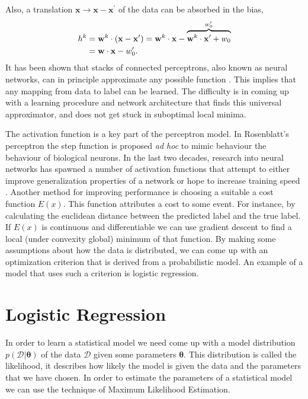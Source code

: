 \noindent Also, a translation $\mathbf{x}\rightarrow \mathbf{x} - \mathbf{x}^\prime$ of the data can be absorbed in the bias,
\begin{align}
    h^k &= \mathbf{w}^{k}\cdot (\mathbf{x} - \mathbf{x}^\prime)= \mathbf{w}^{k} \cdot \mathbf{x} - \overbrace{\mathbf{w}^{k}\cdot\mathbf{x}^\prime + w_0}^{w_0^\prime} \nonumber\\
    & = \mathbf{w}\cdot\mathbf{x} - w_0^\prime \label{eq:transl_inv}.
\end{align}
It has been shown that stacks of connected perceptrons, also known as neural networks, can in principle approximate any possible function \cite{Cybenko1989}. This implies that any mapping from data to label can be learned. The difficulty is in coming up with a learning procedure and network architecture that finds this universal approximator, and does not get stuck in suboptimal local minima. \newline

\noindent The activation function is a key part of the perceptron model. In Rosenblatt's perceptron the step function is proposed \textit{ad hoc} to mimic behaviour the behaviour of biological neurons. In the last two decades, research into neural networks has spawned a number of activation functions that attempt to either improve generalization properties of a network or hope to increase training speed \cite{Glorot15, Clevert2015, Hochreiter1998}. Another method for improving performance is choosing a suitable a cost function $E(x)$. This function attributes a cost to some event. For instance, by calculating the euclidean distance between the predicted label and the true label. If $E(x)$  is continuous and differentiable we can use gradient descent to find a local (under convexity global) minimum of that function. By making some assumptions about how the data is distributed, we can come up with an optimization criterion that is derived from a probabilistic model. An example of a model that uses such a criterion is logistic regression.

\section{Logistic Regression \label{sec:inference}}

In order to learn a statistical model we need come up with a model distribution $p(\mathcal{D} |\bm{\theta})$ of the data $\mathcal{D}$  given some parameters $\bm{\theta}$. This distribution is called the likelihood, it describes how likely the model is given the data and the parameters that we have chosen. In order to estimate the parameters of a statistical model we can use the technique of Maximum Likelihood Estimation. \newline 

